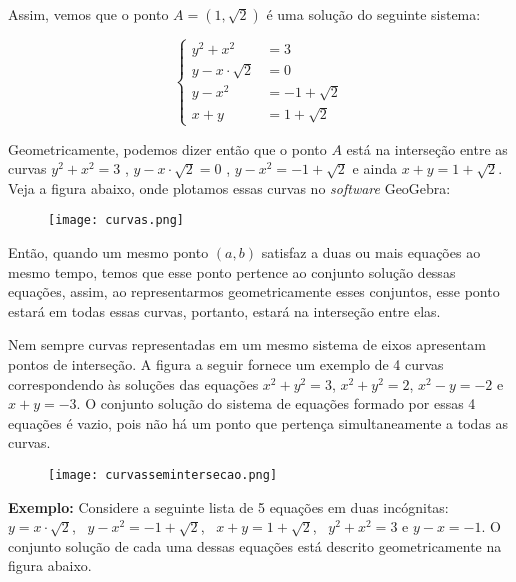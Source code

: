  Assim, vemos que o ponto $A = (1, \sqrt{2})$ é uma solução do seguinte sistema:

\begin{equation*}
\left\{
\begin{aligned}
y^2+x^2&=3\\
y-x\cdot\sqrt{2}&=0\\
y-x^2&=-1+\sqrt{2}\\
x+y&=1+\sqrt{2}
\end{aligned}
\right.
\end{equation*}

Geometricamente, podemos dizer então que o ponto $A$ está na interseção entre as curvas $y^2 + x^2 = 3$  , $y - x\cdot \sqrt{2} = 0$ ,  $y - x^2 = -1 + \sqrt{2}$ e ainda $x + y = 1 + \sqrt{2}$. Veja a figura abaixo, onde plotamos essas curvas no \emph{software} GeoGebra: 


\begin{figure}[H]
\centering

\noindent\texttt{[image: curvas.png]}
\end{figure}


Então, quando um mesmo ponto $(a,b)$ satisfaz a duas ou mais equações ao mesmo tempo, temos que esse ponto pertence ao conjunto solução dessas equações, assim, ao representarmos geometricamente esses conjuntos, esse ponto estará em todas essas curvas, portanto, estará na interseção entre elas.

Nem sempre curvas representadas em um mesmo sistema de eixos apresentam pontos de interseção. A figura a seguir fornece um exemplo de 4 curvas correspondendo às soluções das equações $x^2 + y^2 = 3$, $x^2 + y^2 = 2$, $x^2 - y = -2$ e $x+y = -3$. O conjunto solução do sistema de equações formado por essas 4 equações é vazio, pois não há um ponto que pertença simultaneamente a todas as curvas.


\begin{figure}[H]
\centering

\noindent\texttt{[image: curvassemintersecao.png]}
\end{figure}


\textbf{Exemplo:} Considere a seguinte lista de 5 equações em duas incógnitas: $y = x \cdot \sqrt{2}$, \ $y -x^2 = -1 + \sqrt{2}$, \ $ x+y = 1 + \sqrt{2}$, \ $y^2 + x^2 = 3$ e $y-x = -1$. O conjunto solução de cada uma dessas equações está descrito geometricamente na figura abaixo.  

